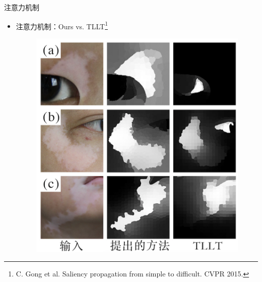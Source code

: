 \begin{frame}{注意力机制}
\begin{itemize}
\item 注意力机制：Ours vs. TLLT\footnote[frame]{\tiny C. Gong et al. Saliency propagation from simple to difficult. CVPR 2015.}
\begin{figure}
    \centering
    \includegraphics[width=.5\linewidth]{figures/TLLT.png}
\end{figure}
\end{itemize}

\end{frame}

